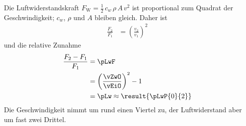 Die Luftwiderstandskraft $F_\text{W} = \frac{1}{2}\,c_w\,\rho\,A\,v^2$ ist proportional zum Quadrat der Geschwindigkeit; $c_w$, $\rho$ und $A$ bleiben gleich. Daher ist
\begin{align}
 \frac{F_2}{F_1} &= \left(\frac{v_2}{v_1}\right)^2
\end{align}
und die relative Zunahme
\begin{align}
 \frac{F_2-F_1}{F_1} &= \pLwF \\
   &= \left(\frac{\vZwO}{\vEiO}\right)^2-1 \\
   &= \pLw \approx \result{\pLwP{0}{2}}
\end{align}
Die Geschwindigkeit nimmt um rund einen Viertel zu, der Luftwiderstand aber um fast zwei Drittel.
